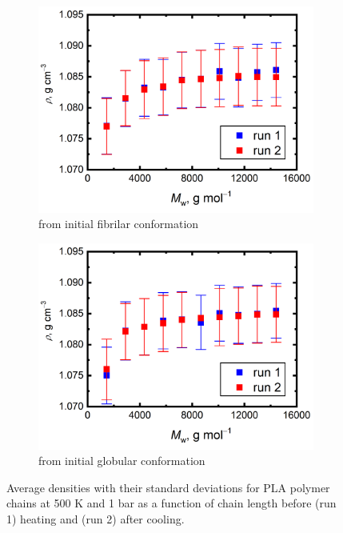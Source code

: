 \begin{figure}[htb!]
	\begin{subfigure}{0.5\textwidth}
		\includegraphics[width=1.0\linewidth]{img/pla_linear_density.png} 
		\caption{from initial fibrilar conformation}
		\vspace{-0.2cm}
	\end{subfigure}
	\begin{subfigure}{0.5\textwidth}
		\includegraphics[width=1.0\linewidth]{img/pla_glob_density.png}
		\caption{from initial globular conformation}
		\vspace{-0.2cm}
	\end{subfigure} 
	\caption{Average densities with their standard deviations for PLA polymer chains at 500 K and 1 bar as a function of chain length before (run 1) heating and (run 2) after cooling.}
	\label{fig:pla_hustoty}
	\vspace{-0.2cm}
\end{figure}

